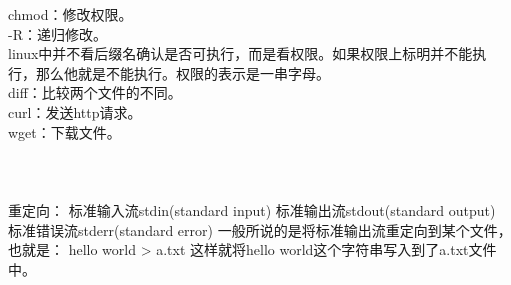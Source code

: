 \documentclass{article}
\begin{document}
\noindent
chmod：修改权限。\\
\hspace*{2em} -R：递归修改。\\
\hspace*{2em} linux中并不看后缀名确认是否可执行，而是看权限。如果权限上标明并不能执行，那么他就是不能执行。权限的表示是一串字母。\\
diff：比较两个文件的不同。\\

\noindent
curl：发送http请求。\\
wget：下载文件。\\
\\
\\
\\

\noindent
重定向：
标准输入流stdin(standard input)
标准输出流stdout(standard output)
标准错误流stderr(standard error)
一般所说的是将标准输出流重定向到某个文件，也就是：
hello world > a.txt
这样就将hello world这个字符串写入到了a.txt文件中。
\end{document}
